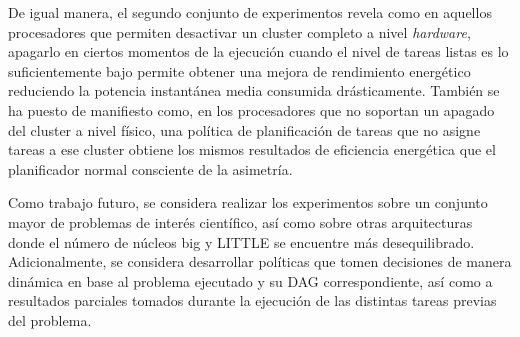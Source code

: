 De igual manera, el segundo conjunto de experimentos revela como en
aquellos procesadores que permiten desactivar un cluster completo a nivel
\emph{hardware}, apagarlo en ciertos momentos de la ejecución cuando el
nivel de tareas listas es lo suficientemente bajo permite obtener una
mejora de rendimiento energético reduciendo la potencia instantánea media
consumida drásticamente. También se ha puesto de manifiesto como, en los
procesadores que no soportan un apagado del cluster a nivel físico, una
política de planificación de tareas que no asigne tareas a ese cluster
obtiene los mismos resultados de eficiencia energética que el planificador
normal consciente de la asimetría.


Como trabajo futuro, se considera realizar los experimentos sobre un
conjunto mayor de problemas de interés científico, así como sobre otras
arquitecturas donde el número de núcleos big y LITTLE se encuentre más
desequilibrado. Adicionalmente, se considera desarrollar políticas que
tomen decisiones de manera dinámica en base al problema ejecutado y su DAG
correspondiente, así como a resultados parciales tomados durante la
ejecución de las distintas tareas previas del problema.



